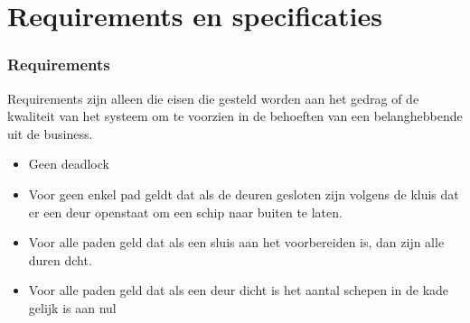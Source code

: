\chapter{Requirements en specificaties}



\subsection{Requirements}
Requirements zijn alleen die eisen die gesteld worden aan het gedrag of de kwaliteit van het systeem om te voorzien in de behoeften van een belanghebbende uit de business.

\begin{itemize}
	\item Geen deadlock
	\item Voor geen enkel pad geldt dat als  de deuren gesloten zijn volgens de kluis dat er een deur openstaat om een schip naar buiten te laten.
	\item Voor alle paden geld dat als een sluis aan het voorbereiden is, dan zijn alle duren dcht.
	\item Voor alle paden geld dat als een deur dicht is het aantal schepen in de kade gelijk is aan nul
	

\end{itemize}
